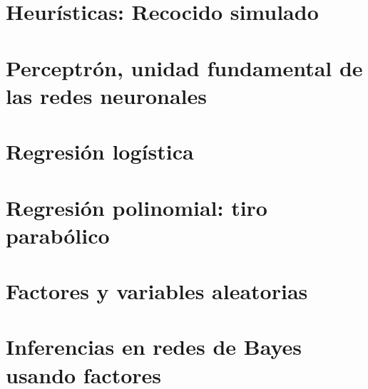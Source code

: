\documentclass[12pt,openany]{book}
\begin{document}
\chapter{Heurísticas: Recocido simulado}








\chapter[Perceptrón]{Perceptrón, unidad fundamental de las redes neuronales}






\chapter{Regresión logística}





\chapter{Regresión polinomial: tiro parabólico}






\chapter{Factores y variables aleatorias}





\chapter[Inferencia]{Inferencias en redes de Bayes usando factores}
\end{document}
